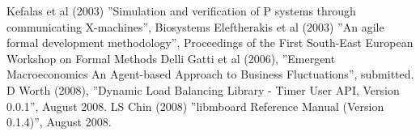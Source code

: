 \begin{thebibliography}{99}
 Kefalas et al (2003) ''Simulation and verification of P systems through communicating X-machines'', Biosystems
 Eleftherakis et al (2003) ''An agile formal development methodology'', Proceedings of the First South-East European Workshop on Formal Methods
 Delli Gatti et al (2006), ''Emergent Macroeconomics An Agent-based Approach to Business Fluctuations'', submitted.
 D Worth (2008), ''Dynamic Load Balancing Library - Timer User API, Version 0.0.1'', August 2008.
 LS Chin (2008)  ''libmboard Reference Manual (Version 0.1.4)'', August 2008.
\end{thebibliography}
